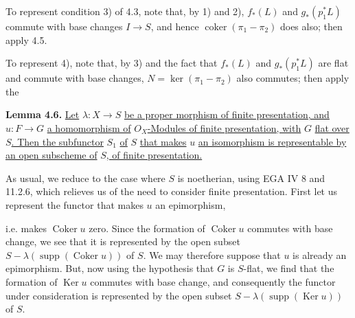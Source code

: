 To represent condition 3) of 4.3, note that, by 1) and 2), \(f_*(L)\) and \(g_*(p_1^*L)\) commute with base changes \(I\to S\), and hence \(\operatorname{coker}(\pi_1-\pi_2)\) does also; then apply 4.5.

To represent 4), note that, by 3) and the fact that \(f_*(L)\) and \(g_*(p_1^*L)\) are flat and commute with base changes, \(N=\ker(\pi_1-\pi_2)\) also commutes; then apply the

\textbf{Lemma 4.6.} \uline{Let} \(\lambda:X\to S\) \uline{be a proper morphism of finite presentation, and} \(u:F\to G\) \uline{a homomorphism of} \({O}_X\)\uline{-Modules of finite presentation, with} \(G\) \uline{flat over} \(S\)\uline{. Then the subfunctor} \(S_1\) \uline{of} \(S\) \uline{that makes} \(u\) \uline{an isomorphism is representable by an open subscheme of} \(S\)\uline{, of finite presentation.}

As usual, we reduce to the case where \(S\) is noetherian, using EGA IV 8 and 11.2.6, which relieves us of the need to consider finite presentation. First let us represent the functor that makes \(u\) an epimorphism,


%
i.e. makes \(\operatorname{Coker}u\) zero. Since the formation of \(\operatorname{Coker}u\) commutes with base change, we see that it is represented by the open subset \(S-\lambda(\operatorname{supp}(\operatorname{Coker}u))\) of \(S\). We may therefore suppose that \(u\) is already an epimorphism. But, now using the hypothesis that \(G\) is \(S\)-flat, we find that the formation of \(\operatorname{Ker}u\) commutes with base change, and consequently the functor under consideration is represented by the open subset \(S-\lambda(\operatorname{supp}(\operatorname{Ker}u))\) of \(S\).

\providecommand{\Ass}{\operatorname{Ass}}
\providecommand{\Hom}{\operatorname{Hom}}
\providecommand{\Ext}{\operatorname{Ext}}
\providecommand{\Proj}{\operatorname{Proj}}
\providecommand{\NS}{\operatorname{NS}}
\providecommand{\Tors}{\operatorname{Tors}}
\providecommand{\Picnum}{\operatorname{Pic}^{\mathrm{num}}}
\providecommand{\Piczero}{\operatorname{Pic}^{0}}
\providecommand{\Pictau}{\operatorname{Pic}^{\tau}}
\providecommand{\length}{\operatorname{length}}
\providecommand{\etale}{\text{\'etale}}

\newpage

